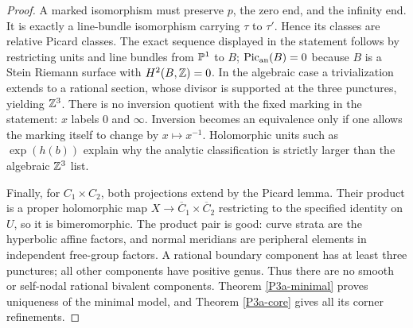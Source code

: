 \begin{proof}
A marked isomorphism must preserve $p$, the zero end, and the
infinity end. It is exactly a line-bundle isomorphism carrying
$\tau$ to $\tau'$. Hence its classes are relative Picard classes.
The exact sequence displayed in the statement follows by
restricting units and line bundles from $\mathbb P^1$ to $B$;
$\operatorname{Pic}_{\rm an}(B)=0$ because $B$ is a Stein
Riemann surface with $H^2(B,\mathbb Z)=0$. In the algebraic case a
trivialization extends to a rational section, whose divisor
is supported at the three punctures, yielding $\mathbb Z^3$.
There is no inversion quotient with the fixed marking in
the statement: $x$ labels $0$ and $\infty$. Inversion becomes
an equivalence only if one allows the marking itself to
change by $x\mapsto x^{-1}$. Holomorphic units such as
$\exp(h(b))$ explain why the analytic classification is
strictly larger than the algebraic $\mathbb Z^3$ list.

Finally, for $C_1\times C_2$, both projections extend by the
Picard lemma. Their product is a proper holomorphic map
$X\to\overline C_1\times\overline C_2$ restricting to the
specified identity on $U$, so it is bimeromorphic. The product
pair is good: curve strata are the hyperbolic affine factors,
and normal meridians are peripheral elements in independent
free-group factors. A rational boundary component has at
least three punctures; all other components have positive
genus. Thus there are no smooth or self-nodal rational
bivalent components. Theorem \ref{P3a-minimal} proves uniqueness
of the minimal model, and Theorem \ref{P3a-core} gives all its
corner refinements.
\end{proof}

